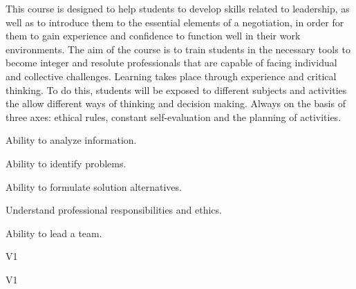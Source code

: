 \begin{syllabus}


\begin{justification}
This course is designed to help students to develop skills related to leadership, as well as to introduce them to the essential elements of a negotiation, in order for them to gain experience and confidence to function well in their work environments. The aim of the
course is to train students in the necessary tools to become integer and resolute professionals that are capable of facing individual and collective challenges. Learning takes place through experience and critical thinking. To do this, students will be exposed
to different subjects and activities the allow different ways of thinking and decision making. Always on the basis of three axes: ethical rules, constant self-evaluation and the planning of activities.
\end{justification}

\begin{goals}
\item Ability to analyze information.
\item Ability to identify problems.
\item Ability to formulate solution alternatives.
\item Understand professional responsibilities and ethics.
\item Ability to lead a team.
\end{goals}

\begin{outcomes}{V1}
    \item {} %
    \item {} %
    \item {} %
    \item {} %
    \item {} %
\end{outcomes}

\begin{competences}{V1}
    \item {}
    \item {}
    \item {}
    \item {}
\end{competences}


\end{syllabus}
